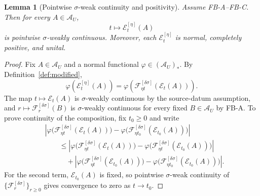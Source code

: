 \documentclass[12pt]{article}
\newtheorem{lemma}[theorem]{Lemma}
\theoremstyle{definition}
\theoremstyle{remark}
\begin{document}
\begin{lemma}[Pointwise \(\sigma\)-weak continuity and positivity]
\label{lem:continuity}
Assume FB-A--FB-C. Then for every \(A\in\mathcal A_U\),
\[
t\longmapsto \mathcal E_t^{[\eta]}(A)
\]
is pointwise \(\sigma\)-weakly continuous. Moreover, each
\(\mathcal E_t^{[\eta]}\) is normal, completely positive, and unital.
\end{lemma}

\begin{proof}
Fix \(A\in\mathcal A_U\) and a normal functional
\(\varphi\in(\mathcal A_U)_*\). By Definition~\ref{def:modified},
\[
\varphi(\mathcal E_t^{[\eta]}(A))
=
\varphi\!\left(
\mathscr F_{\eta t}^{[\delta\sigma]}(\mathcal E_t(A))
\right).
\]
The map \(t\mapsto \mathcal E_t(A)\) is \(\sigma\)-weakly continuous by
the source-datum assumption, and
\(r\mapsto \mathscr F_r^{[\delta\sigma]}(B)\) is
\(\sigma\)-weakly continuous for every fixed \(B\in\mathcal A_U\) by
FB-A. To prove continuity of the composition, fix \(t_0\ge0\) and write
\begin{align*}
&\left|
\varphi\bigl(\mathscr F_{\eta t}^{[\delta\sigma]}(\mathcal E_t(A))\bigr)
-
\varphi\bigl(\mathscr F_{\eta t_0}^{[\delta\sigma]}(\mathcal E_{t_0}(A))\bigr)
\right| \\
&\qquad \le
\left|
\varphi\bigl(\mathscr F_{\eta t}^{[\delta\sigma]}(\mathcal E_t(A))\bigr)
-
\varphi\bigl(\mathscr F_{\eta t}^{[\delta\sigma]}(\mathcal E_{t_0}(A))\bigr)
\right| \\
&\qquad\quad +
\left|
\varphi\bigl(\mathscr F_{\eta t}^{[\delta\sigma]}(\mathcal E_{t_0}(A))\bigr)
-
\varphi\bigl(\mathscr F_{\eta t_0}^{[\delta\sigma]}(\mathcal E_{t_0}(A))\bigr)
\right|.
\end{align*}
For the second term, \(\mathcal E_{t_0}(A)\) is fixed, so pointwise
\(\sigma\)-weak continuity of
\(\{\mathscr F_r^{[\delta\sigma]}\}_{r\ge0}\) gives convergence to
zero as \(t\to t_0\).


\end{proof}
\end{document}
